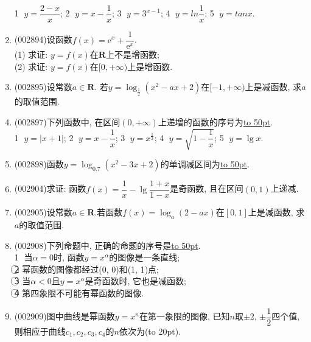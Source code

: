\documentclass[10pt,a4paper]{article}
\newcommand{\blank}[1]{\underline{\hbox to #1pt{}}}
\newcommand{\bracket}[1]{(\hbox to #1pt{})}
\begin{document}
\begin{enumerate}[1.]
\textcircled{1} $y=\dfrac{2-x}x$; \textcircled{2} $y=x-\dfrac 1x$; \textcircled{3} $y={3^{x-1}}$; \textcircled{4} $y=ln\dfrac 1x$; \textcircled{5} $y=tanx$.
\item {\tiny (002894)}设函数$f(x)=\mathrm{e}^x+\dfrac 1{\mathrm{e}^x}$.\\
(1) 求证: $y=f(x)$在$\mathbf{R}$上不是增函数;\\
(2) 求证: $y=f(x)$在$[0,+\infty)$上是增函数.
\item {\tiny (002895)}设常数$a\in \mathbf{R}$. 若$y=\log_{\frac 12}(x^2-ax+2)$在$[-1,+\infty)$上是减函数, 求$a$的取值范围.
\item {\tiny (002897)}下列函数中, 在区间$(0 ,+\infty)$上递增的函数的序号为\blank{50}.\\
\textcircled{1} $y=|x+1|$;  \textcircled{2} $y=x-\dfrac 1x$;    \textcircled{3} $y={x^{\frac 12}}$;    \textcircled{4} $y=\sqrt{1-\dfrac 1x}$; \textcircled{5} $y=\lg x$.
\item {\tiny (002898)}函数$y=\log_{0.7}(x^2-3x+2)$的单调减区间为\blank{50}.
\item {\tiny (002904)}求证: 函数$f(x)=\dfrac 1x-\lg\dfrac{1+x}{1-x}$是奇函数, 且在区间$(0,1)$上递减.
\item {\tiny (002905)}设常数$a\in \mathbf{R}$.若函数$f(x)=\log_a(2-ax)$在$[0,1]$上是减函数, 求$a$的取值范围.
\item {\tiny (002908)}下列命题中, 正确的命题的序号是\blank{50}.\\
\textcircled{1} 当$\alpha =0$时, 函数$y={x^{\alpha }}$的图像是一条直线;\\
\textcircled{2} 幂函数的图像都经过(0, 0)和(1, 1)点;\\
\textcircled{3} 当$\alpha <0$且$y={x^{\alpha }}$是奇函数时, 它也是减函数;\\
\textcircled{4} 第四象限不可能有幂函数的图像.
\item {\tiny (002909)}图中曲线是幂函数$y=x^n$在第一象限的图像, 已知$n$取$\pm 2$, $\pm\dfrac 12$四个值, 则相应于曲线$c_1,c_2,c_3,c_4$的$n$依次为\bracket{20}.
\begin{center}
\end{center}
\end{enumerate}
\end{document}

